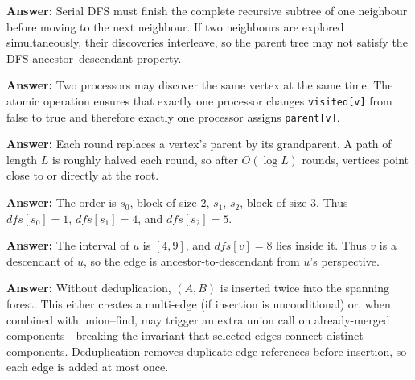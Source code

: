 \begin{ppexercises}

  \textbf{Answer:} Serial DFS must finish the complete recursive subtree of one neighbour before moving to the next neighbour. If two neighbours are explored simultaneously, their discoveries interleave, so the parent tree may not satisfy the DFS ancestor--descendant property.


  \textbf{Answer:} Two processors may discover the same vertex at the same time. The atomic operation ensures that exactly one processor changes \texttt{visited[v]} from false to true and therefore exactly one processor assigns \texttt{parent[v]}.


  \textbf{Answer:} Each round replaces a vertex's parent by its grandparent. A path of length \(L\) is roughly halved each round, so after \(O(\log L)\) rounds, vertices point close to or directly at the root.


  \textbf{Answer:} The order is \(s_0\), block of size \(2\), \(s_1\), \(s_2\), block of size \(3\). Thus \(dfs[s_0]=1\), \(dfs[s_1]=4\), and \(dfs[s_2]=5\).


  \textbf{Answer:} The interval of \(u\) is \([4,9]\), and \(dfs[v]=8\) lies inside it. Thus \(v\) is a descendant of \(u\), so the edge is ancestor-to-descendant from \(u\)'s perspective.


  \textbf{Answer:} Without deduplication, \((A,B)\) is inserted twice into the spanning forest.
  This either creates a multi-edge (if insertion is unconditional) or, when combined with union--find, may trigger an extra union call on already-merged components---breaking the invariant that selected edges connect distinct components.
  Deduplication removes duplicate edge references before insertion, so each edge is added at most once.


\end{ppexercises}
